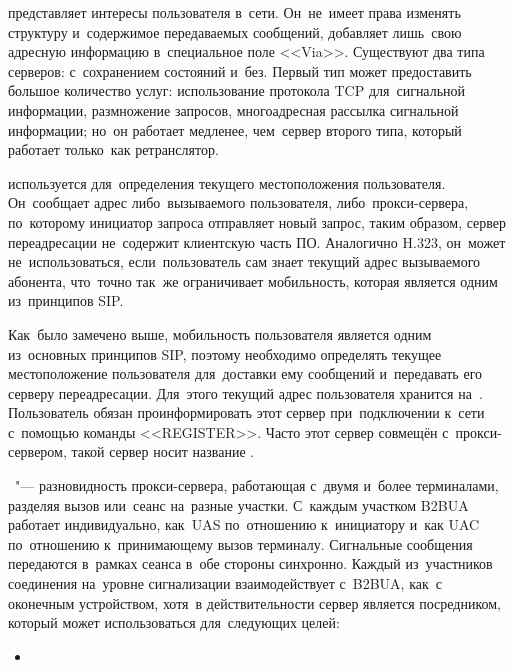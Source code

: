  представляет интересы пользователя в~сети.
Он~не~имеет права изменять структуру и~содержимое передаваемых сообщений, добавляет лишь~свою адресную информацию в~специальное поле <<Via>>.
Существуют два типа серверов: с~сохранением состояний и~без.
Первый тип может предоставить большое количество услуг: использование протокола TCP для~сигнальной информации, размножение запросов, многоадресная рассылка сигнальной информации; но~он работает медленее, чем~сервер второго типа, который работает только~как ретранслятор.

 используется для~определения текущего местоположения пользователя.
Он~сообщает адрес либо~вызываемого пользователя, либо~прокси-сервера, по~которому инициатор запроса отправляет новый запрос, таким образом, сервер переадресации не~содержит клиентскую часть ПО.
Аналогично H.323, он~может не~использоваться, если~пользователь сам знает текущий адрес вызываемого абонента, что~точно так~же ограничивает мобильность, которая является одним из~принципов SIP.

Как~было замечено выше, мобильность пользователя является одним из~основных принципов SIP, поэтому необходимо определять текущее местоположение пользователя для~доставки ему сообщений и~передавать его серверу переадресации.
Для~этого текущий адрес пользователя хранится на~.
Пользователь обязан проинформировать этот сервер при~подключении к~сети с~помощью команды <<REGISTER>>.
Часто этот сервер совмещён с~прокси-сервером, такой сервер носит название .

~"--- разновидность прокси-сервера, работающая с~двумя и~более терминалами, разделяя вызов или~сеанс на~разные участки.
С~каждым участком B2BUA работает индивидуально, как~UAS по~отношению к~инициатору и~как UAC по~отношению к~принимающему вызов терминалу.
Сигнальные сообщения передаются в~рамках сеанса в~обе стороны синхронно.
Каждый из~участников соединения на~уровне сигнализации взаимодействует с~B2BUA, как~с оконечным устройством, хотя~в действительности сервер является посредником, который может использоваться для~следующих целей:
\begin{itemize}
    ;
		 звонка;
		 разъединение;
		 сетей, в~т.\,ч. с~разными диалектами протокола;
		 структуры сетей;
		 потоков данных внутри~сессии;
		\item\etc
\end{itemize}

